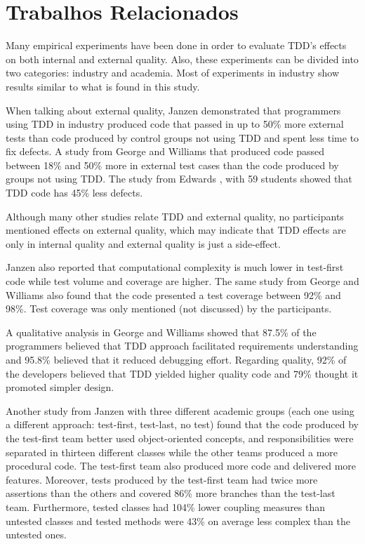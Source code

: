 \chapter{Trabalhos Relacionados}
\label{cap:trabalhos-relacionados}

Many empirical experiments have been done in order to evaluate TDD's effects on
both internal and external quality. Also, these experiments can be divided
into two categories: industry and academia. Most of experiments in industry
show results similar to what is found in this study.

When talking about external quality, Janzen \cite{janzen} demonstrated that
programmers using TDD in industry produced code that passed in up to 50\% more 
external tests than code produced by control groups not using TDD and spent less
time to fix defects. A study from George and Williams \cite{george-williams}
that produced code passed between 18\% and 50\% more in external test cases than the
code produced by groups not using TDD. The study from Edwards \cite{edwards},
with 59 students showed that TDD code has 45\% less defects.

Although many other studies relate TDD and external quality, no participants 
mentioned effects on external quality, which may indicate that TDD effects are
only in internal quality and external quality is just a side-effect.

Janzen \cite{janzen} also reported that computational complexity is much lower
in test-first code while test volume and coverage are higher. 
The same study from George and Williams also found that the code presented a
test coverage between 92\% and 98\%. Test coverage was
only mentioned (not discussed) by the participants.

A qualitative analysis in George and Williams showed that 87.5\% of the
programmers believed that TDD approach facilitated requirements 
understanding and 95.8\% believed that it reduced debugging effort. 
Regarding quality, 92\% of the developers believed that TDD yielded higher
quality code and 79\% thought it promoted simpler design.

Another study from Janzen \cite{janzen-2} with three different academic groups 
(each one using a different approach: test-first, test-last, no test) found that
the code produced by the test-first team better used object-oriented concepts,
and responsibilities were separated in thirteen different classes while the
other teams produced a more procedural code.
The test-first team also produced more code and delivered more features.
Moreover, tests produced by the test-first team had twice more assertions than
the others and covered 86\% more branches than the test-last team. Furthermore,
tested classes had 104\% lower coupling measures than untested classes and
tested methods were 43\% on average less complex than the untested ones.

